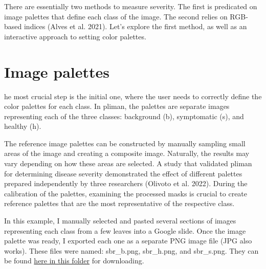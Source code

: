 \documentclass[
  letterpaper,
  DIV=11,
  numbers=noendperiod]{scrreprt}
\begin{document}
There are essentially two methods to measure severity. The first is
predicated on image palettes that define each class of the image. The
second relies on RGB-based indices (Alves et al. 2021). Let's explore
the first method, as well as an interactive approach to setting color
palettes.

\hypertarget{image-palettes}{%
\section{Image palettes}\label{image-palettes}}

he most crucial step is the initial one, where the user needs to
correctly define the color palettes for each class. In pliman, the
palettes are separate images representing each of the three classes:
background (b), symptomatic (s), and healthy (h).

The reference image palettes can be constructed by manually sampling
small areas of the image and creating a composite image. Naturally, the
results may vary depending on how these areas are selected. A study that
validated pliman for determining disease severity demonstrated the
effect of different palettes prepared independently by three researchers
(Olivoto et al. 2022). During the calibration of the palettes, examining
the processed masks is crucial to create reference palettes that are the
most representative of the respective class.

In this example, I manually selected and pasted several sections of
images representing each class from a few leaves into a Google slide.
Once the image palette was ready, I exported each one as a separate PNG
image file (JPG also works). These files were named: sbr\_b.png,
sbr\_h.png, and sbr\_s.png. They can be found
\href{https://github.com/emdelponte/epidemiology-R/tree/main/imgs}{here
in this folder} for downloading.
\end{document}
